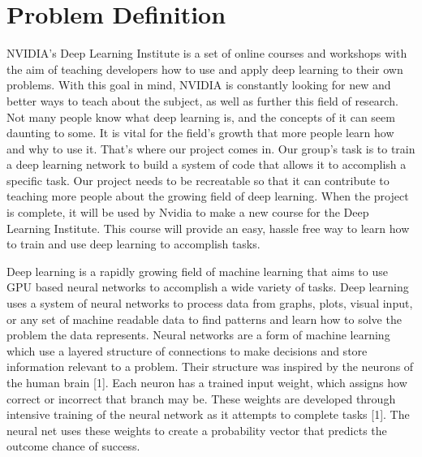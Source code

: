 \documentclass{scrreprt}
\begin{document}
\section{Problem Definition}
NVIDIA’s Deep Learning Institute is a set of online courses and workshops with the aim of teaching developers how to use and apply deep learning to their own problems.
With this goal in mind, NVIDIA is constantly looking for new and better ways to teach about the subject, as well as further this field of research.
Not many people know what deep learning is, and the concepts of it can seem daunting to some.
It is vital for the field's growth that more people learn how and why to use it.
That's where our project comes in.
Our group’s task is to train a deep learning network to build a system of code that allows it to accomplish a specific task.
Our project needs to be recreatable so that it can contribute to teaching more people about the growing field of deep learning.
When the project is complete, it will be used by Nvidia to make a new course for the Deep Learning Institute.
This course will provide an easy, hassle free way to learn how to train and use deep learning to accomplish tasks.


Deep learning is a rapidly growing field of machine learning that aims to use GPU based neural networks to accomplish a wide variety of tasks.
Deep learning uses a system of neural networks to process data from graphs, plots, visual input, or any set of machine readable data to find patterns and learn how to solve the problem the data represents.
Neural networks are a form of machine learning which use a layered structure of connections to make decisions and store information relevant to a problem.
Their structure was inspired by the neurons of the human brain [1].
Each neuron has a trained input weight, which assigns how correct or incorrect that branch may be.
These weights are developed through intensive training of the neural network as it attempts to complete tasks [1].
The neural net uses these weights to create a probability vector that predicts the outcome chance of success.
\end{document}
